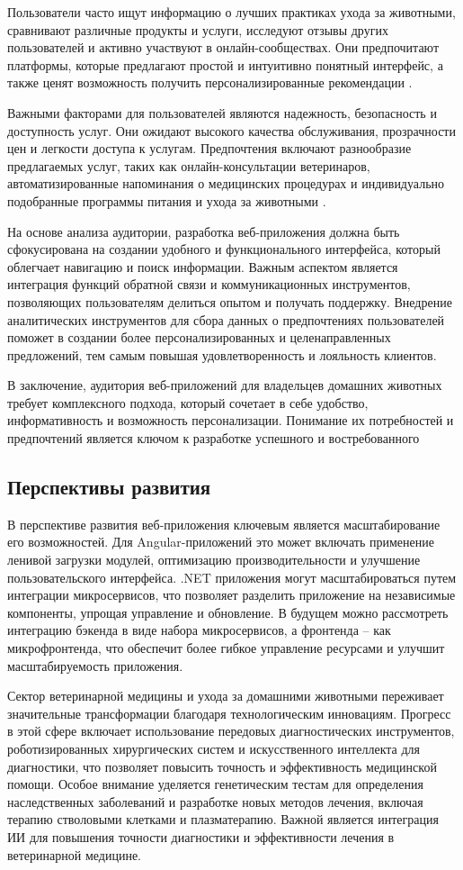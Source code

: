 Пользователи часто ищут информацию о лучших практиках ухода за животными, сравнивают различные продукты и услуги, исследуют отзывы других пользователей и активно участвуют в онлайн-сообществах. Они предпочитают платформы, которые предлагают простой и интуитивно понятный интерфейс, а также ценят возможность получить персонализированные рекомендации \cite{market}.

Важными факторами для пользователей являются надежность, безопасность и доступность услуг. Они ожидают высокого качества обслуживания, прозрачности цен и легкости доступа к услугам. Предпочтения включают разнообразие предлагаемых услуг, таких как онлайн-консультации ветеринаров, автоматизированные напоминания о медицинских процедурах и индивидуально подобранные программы питания и ухода за животными \cite{freedman}.

На основе анализа аудитории, разработка веб-приложения должна быть сфокусирована на создании удобного и функционального интерфейса, который облегчает навигацию и поиск информации. Важным аспектом является интеграция функций обратной связи и коммуникационных инструментов, позволяющих пользователям делиться опытом и получать поддержку. Внедрение аналитических инструментов для сбора данных о предпочтениях пользователей поможет в создании более персонализированных и целенаправленных предложений, тем самым повышая удовлетворенность и лояльность клиентов.

В заключение, аудитория веб-приложений для владельцев домашних животных требует комплексного подхода, который сочетает в себе удобство, информативность и возможность персонализации. Понимание их потребностей и предпочтений является ключом к разработке успешного и востребованного

\subsection{Перспективы развития}

В перспективе развития веб-приложения ключевым является масштабирование его возможностей. Для Angular-приложений это может включать применение ленивой загрузки модулей, оптимизацию производительности и улучшение пользовательского интерфейса. .NET приложения могут масштабироваться путем интеграции микросервисов, что позволяет разделить приложение на независимые компоненты, упрощая управление и обновление. В будущем можно рассмотреть интеграцию бэкенда в виде набора микросервисов, а фронтенда – как микрофронтенда, что обеспечит более гибкое управление ресурсами и улучшит масштабируемость приложения.

Сектор ветеринарной медицины и ухода за домашними животными переживает значительные трансформации благодаря технологическим инновациям. Прогресс в этой сфере включает использование передовых диагностических инструментов, роботизированных хирургических систем и искусственного интеллекта для диагностики, что позволяет повысить точность и эффективность медицинской помощи. Особое внимание уделяется генетическим тестам для определения наследственных заболеваний и разработке новых методов лечения, включая терапию стволовыми клетками и плазматерапию. Важной является интеграция ИИ для повышения точности диагностики и эффективности лечения в ветеринарной медицине.

